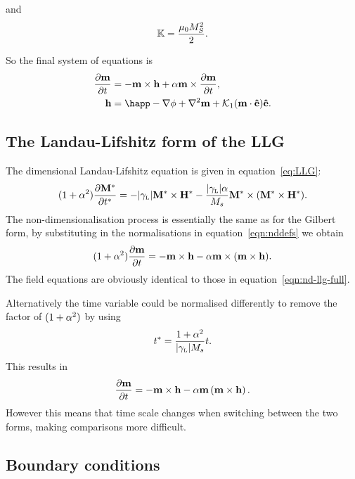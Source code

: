 and
\begin{equation}
  \label{k-normalisation}
  \mathbb{K} = \frac{ \mu_0 M_S^2}{2}.
\end{equation}

So the final system of equations is
\begin{equation}
  \begin{aligned}
    \dmdt &= - \mv \times \hv + \alpha \mv \times \dmdt, \\
    \hv &= \happ - \nabla \phi + \lap \mv + \kone (\mv \cdot \ev) \ev.
    \label{eqn:nd-llg-full}
  \end{aligned}
\end{equation}

\subsection{The Landau-Lifshitz form of the LLG}
\label{sec:land-lifsh-normalisation}

The dimensional Landau-Lifshitz equation is given in equation~\eqref{eq:LLG}:
\begin{equation}
  \label{eq:ll-nd}
  (1 + \alpha^2) \frac{\partial \mathbf{M}^*}{\partial t^*} = - {\left|{\gamma_{\text{\tiny{L}}}} \right|} \mathbf{M}^* \times \mathbf{H}^*
  - \frac{{\left|{\gamma_{\text{\tiny{L}}}} \right|} \alpha}{M_s} \mathbf{M}^* \times (\mathbf{M}^* \times \mathbf{H}^*).
\end{equation}
The non-dimensionalisation process is essentially the same as for the Gilbert form, by substituting in the normalisations in equation~\eqref{eqn:nddefs} we obtain
\begin{equation}
  (1 + \alpha^2) \frac{\partial \mathbf{m}}{\partial t} = - \mathbf{m} \times \mathbf{h} - \alpha \mathbf{m} \times (\mathbf{m} \times \mathbf{h}).
  \label{eq:ll-nd-llglike}
\end{equation}
The field equations are obviously identical to those in equation~\eqref{eqn:nd-llg-full}.


Alternatively the time variable could be normalised differently to remove the factor of $(1 + \alpha^2)$ by using
\begin{equation}
  t^* = \frac{1 + \alpha^2}{{\left|{\gamma_{\text{\tiny{L}}}} \right|} M_s} t.
\end{equation}
This results in
\begin{equation}
  \frac{\partial \mathbf{m}}{\partial t} = -\mathbf{m} \times \mathbf{h} -\alpha \mathbf{m} \left(\mathbf{m} \times \mathbf{h} \right).
  \label{eq:ll-nd-simpler}
\end{equation}
However this means that time scale changes when switching between the two forms, making comparisons more difficult.

\subsection{Boundary conditions}
\label{sec:non-dim-boundary-conditions}

